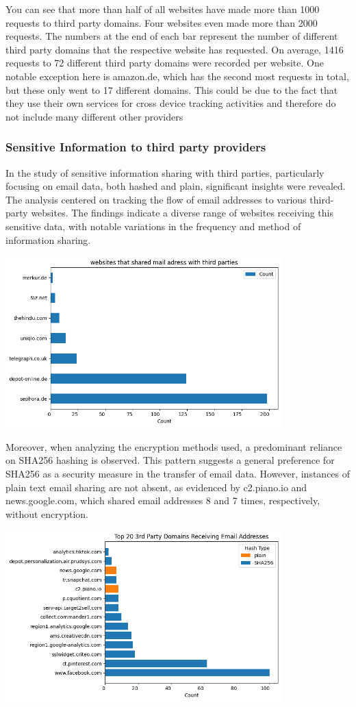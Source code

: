 You can see that more than half of all websites have made more than 1000 requests to third party domains. Four websites even made more than 2000 requests. The numbers at the end of each bar represent the number of different third party domains that the respective website has requested. On average, 1416 requests to 72 different third party domains were recorded per website. One notable exception here is amazon.de, which has the second most requests in total, but these only went to 17 different domains. This could be due to the fact that they use their own services for cross device tracking activities and therefore do not include many different other providers

\subsubsection{Sensitive Information to third party providers}
In the study of sensitive information sharing with third parties, particularly focusing on email data, both hashed and plain, significant insights were revealed. The analysis centered on tracking the flow of email addresses to various third-party websites. The findings indicate a diverse range of websites receiving this sensitive data, with notable variations in the frequency and method of information sharing.

\includegraphics[width=0.8\textwidth]{./assets/websitesSharingMailAddresses.png}

Moreover, when analyzing the encryption methods used, a predominant reliance on SHA256 hashing is observed. This pattern suggests a general preference for SHA256 as a security measure in the transfer of email data. However, instances of plain text email sharing are not absent, as evidenced by c2.piano.io and news.google.com, which shared email addresses 8 and 7 times, respectively, without encryption.

\includegraphics[width=0.8\textwidth]{./assets/top20thirdpartydomainsreceivingmailaddresses.png}

